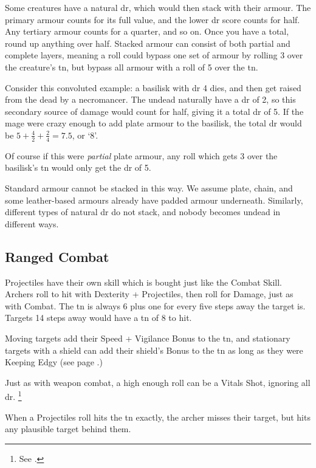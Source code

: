 \begin{multicols}{2}
Some creatures have a natural \gls{dr}, which would then stack with their armour.
The primary armour counts for its full value, and the lower \gls{dr} score counts for half.
Any tertiary armour counts for a quarter, and so on.
Once you have a total, round up anything over half.
Stacked armour can consist of both partial and complete layers, meaning a roll could bypass one set of armour by rolling 3 over the creature's \gls{tn}, but bypass all armour with a roll of 5 over the \gls{tn}.


Consider this convoluted example: a basilisk with \gls{dr} 4 dies, and then get raised from the dead by a necromancer.
The undead naturally have a \gls{dr} of 2, so this secondary source of damage would count for half, giving it a total \gls{dr} of 5.
If the mage were crazy enough to add plate armour to the basilisk, the total \gls{dr} would be $5 + \frac{4}{2} + \frac{2}{4} = 7.5$, or `8'.

Of course if this were \textit{partial} plate armour, any roll which gets 3 over the basilisk's \gls{tn} would only get the \gls{dr} of 5.

Standard armour cannot be stacked in this way.
We assume plate, chain, and some leather-based armours already have padded armour underneath.
Similarly, different types of natural \gls{dr} do not stack, and nobody becomes undead in different ways.

\subsection{Ranged Combat}

\noindent
Projectiles have their own \gls{skill} which is bought just like the Combat Skill.
Archers roll to hit with Dexterity + Projectiles, then roll for Damage, just as with Combat.
The \gls{tn} is always 6 plus one for every five steps away the target is.
Targets 14 steps away would have a \gls{tn} of 8 to hit.

Moving targets add their Speed + Vigilance Bonus to the \gls{tn}, and stationary targets with a shield can add their shield's Bonus to the \gls{tn} as long as they were Keeping Edgy (see page \pageref{edgy}.)

Just as with weapon combat, a high enough roll can be a Vitals Shot, ignoring all \gls{dr}.
\footnote{See .}

When a Projectiles roll hits the \gls{tn} exactly, the archer misses their target, but hits any plausible target behind them.


\end{multicols}
